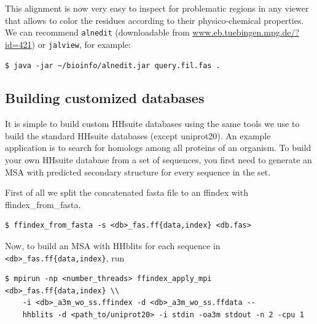 \documentclass[11pt,a4paper]{article}
\begin{document}
This alignment is now very easy to inspect for problematic regions in any viewer that allows to color the residues according to their physico-chemical properties. We can recommend \verb`alnedit` (downloadable from \url{www.eb.tuebingen.mpg.de/?id=421}) or \verb`jalview`, for example:
\begin{verbatim}
$ java -jar ~/bioinfo/alnedit.jar query.fil.fas .
\end{verbatim}





\subsection{Building customized databases} \label{building_dbs}

It is simple to build custom HHsuite databases using the same tools we use to build the standard HHsuite databases (except uniprot20). An example application is to search for homologs among all proteins of an organism. To build your own HHsuite database from a set of sequences, you first need to generate an MSA with predicted secondary structure for every sequence in the set.

First of all we split the concatenated fasta file to an ffindex with ffindex\_from\_fasta.

\begin{verbatim}
$ ffindex_from_fasta -s <db>_fas.ff{data,index} <db.fas> 
\end{verbatim}

Now, to build an MSA with HHblits for each sequence in \verb`<db>_fas.ff{data,index}`, run\\[-1mm]

\begin{verbatim}
$ mpirun -np <number_threads> ffindex_apply_mpi <db>_fas.ff{data,index} \\
    -i <db>_a3m_wo_ss.ffindex -d <db>_a3m_wo_ss.ffdata -- 
    hhblits -d <path_to/uniprot20> -i stdin -oa3m stdout -n 2 -cpu 1
\end{verbatim}
\end{document}
